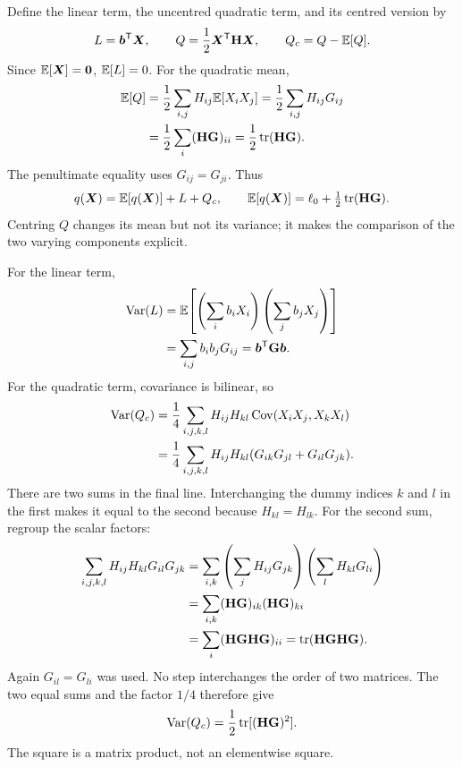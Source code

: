 Define the linear term, the uncentred quadratic term, and its centred version
by
\begin{equation}
L=\boldsymbol{b}^{\mathsf T}\boldsymbol{X},
\qquad Q=\frac12\boldsymbol{X}^{\mathsf T}\mathbf{H}\boldsymbol{X},
\qquad Q_c=Q-\mathbb E[Q].
\label{gaussian:terms}
\end{equation}
Since $\mathbb E[\boldsymbol{X}]=\boldsymbol{0}$, $\mathbb E[L]=0$. For the quadratic mean,
\begin{align}
\mathbb E[Q]
 &=\frac12\sum_{i,j}H_{ij}\mathbb E[X_iX_j]
   =\frac12\sum_{i,j}H_{ij}G_{ij}\nonumber\\
 &=\frac12\sum_i(\mathbf{H}\mathbf{G})_{ii}
   =\frac12\operatorname{tr}(\mathbf{H}\mathbf{G}).
\label{gaussian:quadratic_mean}
\end{align}
The penultimate equality uses $G_{ij}=G_{ji}$. Thus
\[
q(\boldsymbol{X})=\mathbb E[q(\boldsymbol{X})]+L+Q_c,
\qquad
\mathbb E[q(\boldsymbol{X})]=\ell_0+\tfrac12\operatorname{tr}(\mathbf{H}\mathbf{G}).
\]
Centring $Q$ changes its mean but not its variance; it makes the comparison
of the two varying components explicit.

For the linear term,
\begin{align}
\operatorname{Var}(L)
 &=\mathbb E\!\left[\left(\sum_i b_iX_i\right)
                   \left(\sum_j b_jX_j\right)\right]\nonumber\\
 &=\sum_{i,j}b_i b_jG_{ij}
   =\boldsymbol{b}^{\mathsf T}\mathbf{G}\boldsymbol{b}.
\label{gaussian:linear_variance}
\end{align}
For the quadratic term, covariance is bilinear, so
\begin{align}
\operatorname{Var}(Q_c)
 &=\frac14\sum_{i,j,k,l}H_{ij}H_{kl}
       \operatorname{Cov}(X_iX_j,X_kX_l)\nonumber\\
 &=\frac14\sum_{i,j,k,l}H_{ij}H_{kl}
       (G_{ik}G_{jl}+G_{il}G_{jk}).
\label{gaussian:four_index_variance}
\end{align}
There are two sums in the final line. Interchanging the dummy indices $k$
and $l$ in the first makes it equal to the second because $H_{kl}=H_{lk}$.
For the second sum, regroup the scalar factors:
\begin{align}
\sum_{i,j,k,l}H_{ij}H_{kl}G_{il}G_{jk}
 &=\sum_{i,k}
     \left(\sum_jH_{ij}G_{jk}\right)
     \left(\sum_lH_{kl}G_{li}\right)\nonumber\\
 &=\sum_{i,k}(\mathbf{H}\mathbf{G})_{ik}(\mathbf{H}\mathbf{G})_{ki}\nonumber\\
 &=\sum_i(\mathbf{H}\mathbf{G}\mathbf{H}\mathbf{G})_{ii}
   =\operatorname{tr}(\mathbf{H}\mathbf{G}\mathbf{H}\mathbf{G}).
\end{align}
Again $G_{il}=G_{li}$ was used. No step interchanges the order of two
matrices. The two equal sums and the factor $1/4$ therefore give
\begin{equation}
\operatorname{Var}(Q_c)=\frac12\operatorname{tr}[(\mathbf{H}\mathbf{G})^2].
\label{gaussian:quadratic_variance}
\end{equation}
The square is a matrix product, not an elementwise square.


